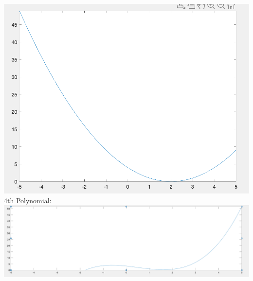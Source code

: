 \documentclass[12pt]{article}
\theoremstyle{homework}
\begin{document}
\includegraphics[scale=0.5]{3rd.png}
\newline
4th Polynomial:
\newline
\includegraphics[scale=0.5]{4th.png}
\end{document}
